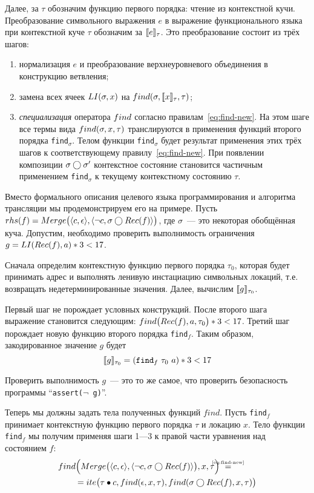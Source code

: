 Далее, за $\tau$ обозначим функцию первого порядка: чтение из контекстной кучи. Преобразование символьного выражения $e$ в выражение функционального языка при контекстной куче $\tau$ обозначим за $\llbracket e\rrbracket_{\tau}$. Это преобразование состоит из трёх шагов:
\begin{enumerate}
\item нормализация $e$ и преобразование верхнеуровневого объединения в конструкцию ветвления;
\item замена всех ячеек $LI(\sigma, x)$ на $find(\sigma,\llbracket x\rrbracket_{\tau},\tau)$;
\item \emph{специализация} оператора $find$ согласно правилам~\eqref{eq:find-new}. На этом шаге все термы вида $find(\sigma,x,\tau)$ транслируются в применения функций второго порядка \texttt{find}$_\sigma$. Телом функции \texttt{find}$_\sigma$ будет результат применения этих трёх шагов к соответствующему правилу~\eqref{eq:find-new}. При появлении композиции $\sigma\bigcirc\sigma'$ контекстное состояние становится частичным применением \texttt{find}$_{\sigma}$ к текущему контекстному состоянию $\tau$.
\end{enumerate}

Вместо формального описания целевого языка программирования и алгоритма трансляции мы продемонстрируем его на примере. Пусть $rhs(f)=Merge\big(\langle c, \epsilon\rangle,\langle\neg c, \sigma\bigcirc Rec(f)\rangle\big)$, где $\sigma$~--- это некоторая обобщённая куча. Допустим, необходимо проверить выполнимость ограничения $g = LI(Rec(f), a) * 3 < 17$.

Сначала определим контекстную функцию первого порядка $\tau_0$, которая будет принимать адрес и выполнять ленивую инстациацию символьных локаций, т.е. возвращать недетерминированные значения. Далее, вычислим $\llbracket g\rrbracket_{\tau_0}$.

Первый шаг не порождает условных конструкций. После второго шага выражение становится следующим: $find\big(Rec(f),a,\tau_0\big) * 3 < 17$. Третий шаг порождает новую функцию второго порядка \texttt{find}$_f$. Таким образом, закодированное значение $g$ будет
\[
	\llbracket g\rrbracket_{\tau_0} = (\texttt{find}_f\,\,\tau_0\,\,a) * 3 < 17
\]

Проверить выполнимость $g$~--- это то же самое, что проверить безопасность программы \mbox{``\texttt{assert($\neg$ g)}''}.

Теперь мы должны задать тела полученных функций $find$. Пусть \texttt{find}$_f$ принимает контекстную функцию первого порядка $\tau$ и локацию $x$. Тело функции \texttt{find}$_f$ мы получим применяя шаги 1---3 к правой части уравнения над состоянием $f$:
\begin{align*}
&\Findnew{\GMerge{\pair{c}{\emptyheap},\pair{\neg c}{\gcompose{\sigma}{\grec{f}}}}}{x}{\tau}~\eqbyref{eq:find-new}\\
&\qquad=\Ite{\fillterm{\tau}{c}}{\findnew{\emptyheap}{x}{\tau}}{\findnew{\GCompose{\sigma}{\grec{f}}}{x}{\tau}}
\end{align*}

